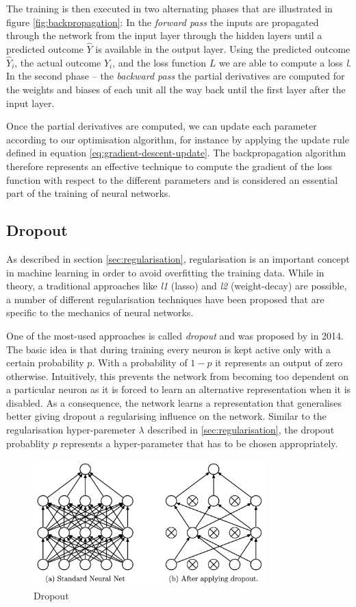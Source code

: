 The training is then executed in two alternating phases that are illustrated in figure \ref{fig:backpropagation}: In the \emph{forward pass} the inputs are propagated through the network from the input layer through the hidden layers until a predicted outcome $\hat{Y}$ is available in the output layer. Using the predicted outcome $\hat{Y}_i$, the actual outcome $Y_i$, and the loss function $L$ we are able to compute a loss \emph{l}.
In the second phase -- the \emph{backward pass} the partial derivatives are computed for the weights and biases of each unit all the way back until the first layer after the input layer. 

Once the partial derivatives are computed, we can update each parameter according to our optimisation algorithm, for instance by applying the update rule defined in equation \ref{eq:gradient-descent-update}. 
The backpropagation algorithm therefore represents an effective technique to compute the gradient of the loss function with respect to the different parameters and is considered an essential part of the training of neural networks. 


\subsection{Dropout} \label{sec:dropout}
As described in section \ref{sec:regularisation}, regularisation is an important concept in machine learning in order to avoid overfitting the training data. While in theory, a traditional approaches like \emph{l1} (lasso) and \emph{l2} (weight-decay) are possible, a number of different regularisation techniques have been proposed that are specific to the mechanics of neural networks. 

One of the most-used approaches is called \emph{dropout} and was proposed by %
in 2014. The basic idea is that during training every neuron is kept active only with a certain probability $p$. With a probability of $1-p$ it represents an output of zero otherwise. Intuitively, this prevents the network from becoming too dependent on a particular neuron as it is forced to learn an alternative representation when it is disabled. As a consequence, the network learns a representation that generalises better giving dropout a regularising influence on the network. Similar to the regularisation hyper-paremeter $\lambda$ described in \ref{sec:regularisation}, the dropout probablity $p$ represents a hyper-parameter that has to be chosen appropriately.
\begin{figure}[h]
	\centering
	\includegraphics[width=0.8\textwidth]{figures/chapter-2/dropout.png}
		\caption{Dropout}\label{fig:dropout}
\end{figure}


